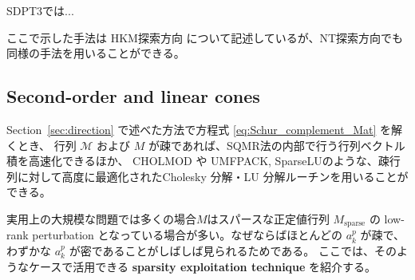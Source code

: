 \documentclass{jsarticle}
\begin{document}
SDPT3では...

\medskip

ここで示した手法は HKM探索方向 について記述しているが、NT探索方向でも同様の手法を用いることができる。


\subsection{Second-order and linear cones} \label{sec:exploit_sparsity_socp_lp}
Section~\ref{sec:direction} で述べた方法で方程式 \eqref{eq:Schur_complement_Mat} を解くとき、
行列 $\mathcal{M}$ および $M$ が疎であれば、SQMR法の内部で行う行列ベクトル積を高速化できるほか、
CHOLMOD や UMFPACK, SparseLUのような、疎行列に対して高度に最適化されたCholesky 分解・LU 分解ルーチンを用いることができる。

実用上の大規模な問題では多くの場合$M$はスパースな正定値行列 $M_{\mathrm{sparse}}$ の low-rank perturbation となっている場合が多い。なぜならばほとんどの $a^p_k$ が疎で、わずかな $a^p_k$ が密であることがしばしば見られるためである。
ここでは、そのようなケースで活用できる \textbf{sparsity exploitation technique} を紹介する。
\end{document}
